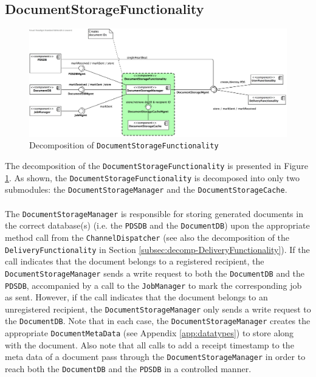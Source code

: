 \documentclass[a4paper,10pt]{article}
\begin{document}
\subsection{DocumentStorageFunctionality}\label{subsec:decomp-DocumentStorageFunctionality}
\begin{figure}[!htp]
	\centering
	\includegraphics[width=1.0\textwidth]{DocumentStorageFunctionality.png}
	\caption{Decomposition of \texttt{DocumentStorageFunctionality}}
	\label{fig:decomp-DocumentStorageFunctionality}
\end{figure}
\FloatBarrier
\noindent
The decomposition of the \texttt{DocumentStorageFunctionality} is presented in Figure \ref{fig:decomp-DocumentStorageFunctionality}. As shown, the \texttt{DocumentStorageFunctionality} is decomposed into only two submodules: the \texttt{DocumentStorageManager} and the \texttt{DocumentStorageCache}.\\\\
The \texttt{DocumentStorageManager} is responsible for storing generated documents in the correct database(s) (i.e. the \texttt{PDSDB} and the \texttt{DocumentDB}) upon the appropriate method call from the \texttt{ChannelDispatcher} (see also the decomposition of the \texttt{DeliveryFunctionality} in Section \ref{subsec:decomp-DeliveryFunctionality}). If the call indicates that the document belongs to a registered recipient, the \texttt{DocumentStorageManager} sends a write request to both the \texttt{DocumentDB} and the \texttt{PDSDB}, accompanied by a call to the \texttt{JobManager} to mark the corresponding job as sent. However, if the call indicates that the document belongs to an unregistered recipient, the \texttt{DocumentStorageManager} only sends a write request to the \texttt{DocumentDB}. Note that in each case, the \texttt{DocumentStorageManager} creates the appropriate \texttt{DocumentMetaData} (see Appendix \ref{app:datatypes}) to store along with the document. Also note that all calls to add a receipt timestamp to the meta data of a document pass through the \texttt{DocumentStorageManager} in order to reach both the \texttt{DocumentDB} and the \texttt{PDSDB} in a controlled manner.\\\\
\end{document}

